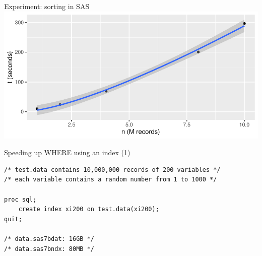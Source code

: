 \documentclass[aspectratio=169,12pt,usepdftitle=false]{beamer} %
\begin{document}
\begin{frame}{Experiment: sorting in SAS}
\centering
\includegraphics[height=0.8\textheight]
	{ref/sort-bench.pdf}
\end{frame}

\begin{frame}[fragile]{Speeding up WHERE using an index (1)}
\begin{verbatim}
/* test.data contains 10,000,000 records of 200 variables */
/* each variable contains a random number from 1 to 1000 */

proc sql;
    create index xi200 on test.data(xi200);
quit;

/* data.sas7bdat: 16GB */
/* data.sas7bndx: 80MB */
\end{verbatim}
\end{frame}
\end{document}
